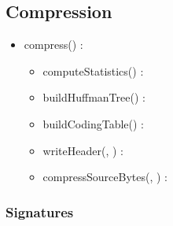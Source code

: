 \subsection{Compression}


\begin{itemize}
    \item compress(\binaryFile) : \binaryFile
    \begin{itemize}
        \item computeStatistics(\binaryFile) : \statistics
        \item buildHuffmanTree(\statistics) : \huffmanTree
        \item buildCodingTable(\huffmanTree) : \codingTable
        \item writeHeader(\binaryFile, \codingTable) : \binaryFile
        \item compressSourceBytes(\binaryFile, \codingTable) : \binaryFile
    \end{itemize}
\end{itemize}

\subsubsection{Signatures}